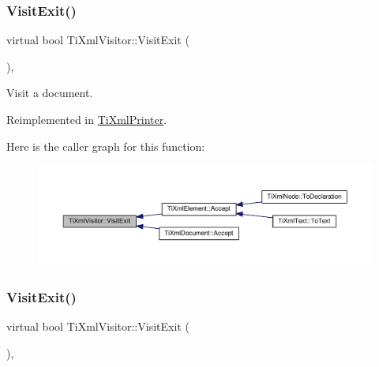 \subsubsection{\texorpdfstring{Visit\+Exit()}{VisitExit()}\hspace{0.1cm}{\footnotesize\ttfamily [1/2]}}
{\footnotesize\ttfamily virtual bool Ti\+Xml\+Visitor\+::\+Visit\+Exit (\begin{DoxyParamCaption}\item[{const \hyperlink{class_ti_xml_document}{Ti\+Xml\+Document} \&}]{ }\end{DoxyParamCaption})\hspace{0.3cm}{\ttfamily [inline]}, {\ttfamily [virtual]}}



Visit a document. 



Reimplemented in \hyperlink{class_ti_xml_printer_a0a636046fa589b6d7f3e5bd025b3f33e}{Ti\+Xml\+Printer}.

Here is the caller graph for this function\+:\nopagebreak
\begin{figure}[H]
\begin{center}
\leavevmode
\includegraphics[width=350pt]{class_ti_xml_visitor_aa0ade4f27087447e93974e975c3246ad_icgraph}
\end{center}
\end{figure}
\mbox{\label{class_ti_xml_visitor_aec2b1f8116226d52f3a1b95dafd3a32c}} 
\subsubsection{\texorpdfstring{Visit\+Exit()}{VisitExit()}\hspace{0.1cm}{\footnotesize\ttfamily [2/2]}}
{\footnotesize\ttfamily virtual bool Ti\+Xml\+Visitor\+::\+Visit\+Exit (\begin{DoxyParamCaption}\item[{const \hyperlink{class_ti_xml_element}{Ti\+Xml\+Element} \&}]{ }\end{DoxyParamCaption})\hspace{0.3cm}{\ttfamily [inline]}, {\ttfamily [virtual]}}



